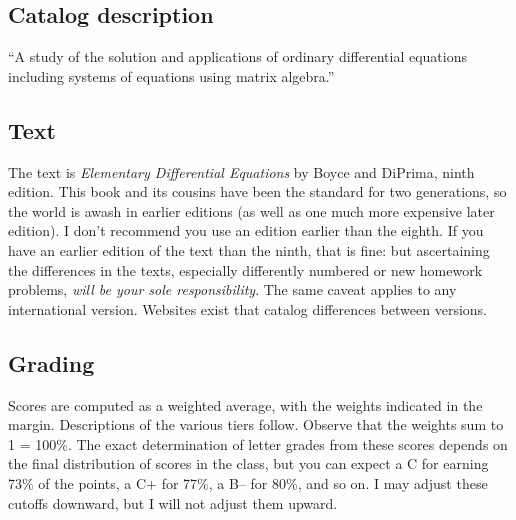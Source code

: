 \documentclass[symmetric]{tufte-handout}
\begin{document}
\subsection{Catalog description}

“A study of the solution and applications of ordinary differential equations
including systems of equations using matrix algebra.”

\subsection{Text}

The text is \emph{Elementary Differential Equations} by Boyce
and DiPrima, ninth edition. This book and its cousins%
have been the standard
for two generations, so the world is awash in earlier editions (as well as
one much more expensive later edition). I don't recommend you use an edition
earlier than the eighth. If you have an earlier edition of the text than the
ninth, that is fine: but ascertaining the differences in the texts,
especially differently numbered or new homework problems, \emph{will be your
sole responsibility}. The same caveat applies to any international version.
Websites exist that catalog differences between versions.

\subsection{Grading}

Scores%
are computed as a weighted average, with the weights indicated in the
margin. Descriptions of the various tiers follow. 
Observe that the weights sum to 1 = 100\%. The exact determination of letter
grades from these scores depends on the final distribution of scores in the
class, but you can expect a C for earning 73\% of the points, a C+ for
77\%, a B– for 80\%, and so on. I may adjust these cutoffs downward, but
I will not adjust them upward.
\end{document}
